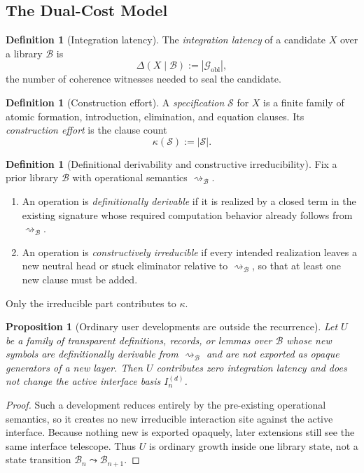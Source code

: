 \documentclass[11pt,a4paper]{article}
\theoremstyle{plain}
\newtheorem{proposition}[theorem]{Proposition}
\theoremstyle{definition}
\newtheorem{definition}[theorem]{Definition}
\theoremstyle{remark}
\newcommand{\B}{\mathcal{B}}
\newcommand{\Gcal}{\mathcal{G}}
\begin{document}
\subsection{The Dual-Cost Model}

\begin{definition}[Integration latency]
\label{def:latency}
The \emph{integration latency} of a candidate $X$ over a library $\B$ is
\[
  \Delta(X\mid \B):=|\Gcal_{\mathrm{obl}}|,
\]
the number of coherence witnesses needed to seal the candidate.
\end{definition}

\begin{definition}[Construction effort]
\label{def:effort}
A \emph{specification} $\mathcal S$ for $X$ is a finite family of atomic formation, introduction, elimination, and equation clauses.  Its \emph{construction effort} is the clause count
\[
  \kappa(\mathcal S):=|\mathcal S|.
\]
\end{definition}

\begin{definition}[Definitional derivability and constructive irreducibility]
\label{def:derivable}
Fix a prior library $\B$ with operational semantics $\rightsquigarrow_{\B}$.
\begin{enumerate}[nosep]
    \item An operation is \emph{definitionally derivable} if it is realized by a closed term in the existing signature whose required computation behavior already follows from $\rightsquigarrow_{\B}$.
    \item An operation is \emph{constructively irreducible} if every intended realization leaves a new neutral head or stuck eliminator relative to $\rightsquigarrow_{\B}$, so that at least one new clause must be added.
\end{enumerate}
Only the irreducible part contributes to $\kappa$.
\end{definition}

\begin{proposition}[Ordinary user developments are outside the recurrence]
\label{prop:ordinary-user}
Let $U$ be a family of transparent definitions, records, or lemmas over $\B$ whose new symbols are definitionally derivable from $\rightsquigarrow_{\B}$ and are not exported as opaque generators of a new layer.  Then $U$ contributes zero integration latency and does not change the active interface basis $I_n^{(d)}$.
\end{proposition}

\begin{proof}
Such a development reduces entirely by the pre-existing operational semantics, so it creates no new irreducible interaction site against the active interface.  Because nothing new is exported opaquely, later extensions still see the same interface telescope.  Thus $U$ is ordinary growth inside one library state, not a state transition $\B_n\leadsto\B_{n+1}$.
\end{proof}
\end{document}
